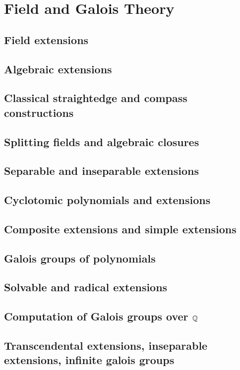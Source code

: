 \chapter{Field and Galois Theory}\label{cha:galois-theory}

\section{Field extensions}

\section{Algebraic extensions}

\section{Classical straightedge and compass constructions}

\section{Splitting fields and algebraic closures}

\section{Separable and inseparable extensions}

\section{Cyclotomic polynomials and extensions}

\section{Composite extensions and simple extensions}

\section{Galois groups of polynomials}

\section{Solvable and radical extensions}

\section{Computation of Galois groups over \(\mathbb{Q}\)}

\section{Transcendental extensions, inseparable extensions, infinite galois groups}

